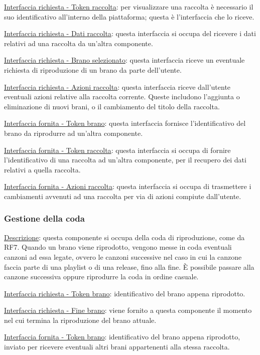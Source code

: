 \documentclass[a4paper,12pt]{article}
\begin{document}
\underline{Interfaccia richiesta - Token raccolta}: per visualizzare una raccolta è necessario il suo identificativo all’interno della piattaforma; questa è l’interfaccia che lo riceve.

\underline{Interfaccia richiesta - Dati raccolta}: questa interfaccia si occupa del ricevere i dati relativi ad una raccolta da un’altra componente.

\underline{Interfaccia richiesta - Brano selezionato}: questa interfaccia riceve un eventuale richiesta di riproduzione di un brano da parte dell’utente.

\underline{Interfaccia richiesta - Azioni raccolta}: questa interfaccia riceve dall’utente eventuali azioni relative alla raccolta corrente. Queste includono l’aggiunta o eliminazione di nuovi brani, o il cambiamento del titolo della raccolta.

\underline{Interfaccia fornita - Token brano}: questa interfaccia fornisce l’identificativo del brano da riprodurre ad un’altra componente.

\underline{Interfaccia fornita - Token raccolta}: questa interfaccia si occupa di fornire l’identificativo di una raccolta ad un’altra componente, per il recupero dei dati relativi a quella raccolta.

\underline{Interfaccia fornita - Azioni raccolta}: questa interfaccia si occupa di trasmettere i cambiamenti avvenuti ad una raccolta per via di azioni compiute dall’utente.

\subsubsection{Gestione della coda}

\underline{Descrizione}: questa componente si occupa della coda di riproduzione, come da RF7. Quando un brano viene riprodotto, vengono messe in coda eventuali canzoni ad essa legate, ovvero le canzoni successive nel caso in cui la canzone faccia parte di una playlist o di una release, fino alla fine. È possibile passare alla canzone successiva oppure riprodurre la coda in ordine casuale.

\underline{Interfaccia richiesta - Token brano}: identificativo del brano appena riprodotto.

\underline{Interfaccia richiesta - Fine brano}: viene fornito a questa componente il momento nel cui termina la riproduzione del brano attuale.

\underline{Interfaccia fornita - Token brano}: identificativo del brano appena riprodotto, inviato per ricevere eventuali altri brani appartenenti alla stessa raccolta.
\end{document}
